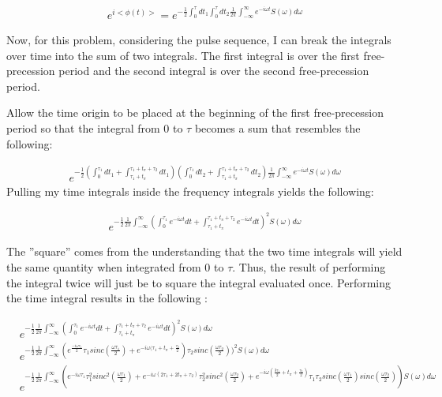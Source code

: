 \documentclass[12pt]{article}
\begin{document}
\begin{align}
e^{i<\phi(t)>} = e^{-\frac{1}{2}\int_0^\tau d t_1 \int_0^\tau d t_2 \frac{1}{2\pi}\int_{-\infty}^{\infty}e^{-i\omega t} S(\omega)d\omega} \nonumber
\end{align}

Now, for this problem, considering the pulse sequence, I can break the integrals over time into the sum of two integrals. The first integral is over the first free-precession period and the second integral is over the second free-precession period.

Allow the time origin to be placed at the beginning of the first free-precession period so that the integral from 0 to $\tau$ becomes a sum that resembles the following:

\begin{align}
e^{-\frac{1}{2}(\int_0^{\tau_1} d t_1 + \int_{\tau_1+t_\pi}^{\tau_1+t_\pi+\tau_2} d t_1) (\int_0^{\tau_1} d t_2 + \int_{\tau_1+t_\pi}^{\tau_1+t_\pi+\tau_2} d t_2) \frac{1}{2\pi}\int_{-\infty}^{\infty}e^{-i\omega t}S(\omega) d\omega}  \nonumber
\end{align}
Pulling my time integrals inside the frequency integrals yields the following:

\begin{align}
e^{-\frac{1}{2}\frac{1}{2\pi}\int_{-\infty}^{\infty}(\int_0^{\tau_1} e^{-i\omega t} dt + \int_{\tau_1+t_\pi}^{\tau_1+t_\pi+\tau_2} e^{-i\omega t} dt )^2 S(\omega) d\omega} \nonumber
\end{align}

The ''square'' comes from the understanding that the two time integrals will yield the same quantity when integrated from 0 to $\tau$. Thus, the result of performing the integral twice will just be to square the integral evaluated once. Performing the time integral results in the following :

\begin{align}
&e^{-\frac{1}{2}\frac{1}{2\pi}\int_{-\infty}^{\infty}(\int_0^{\tau_1} e^{-i\omega t} dt + \int_{\tau_1+t_\pi}^{\tau_1+t_\pi+\tau_2} e^{-i\omega t} dt )^2 S(\omega) d\omega} \nonumber \\
&e^{-\frac{1}{2}\frac{1}{2\pi}\int_{-\infty}^{\infty}(e^{\frac{-i\omega \tau_1}{2}} \tau_1 sinc(\frac{\omega \tau_1}{2}) + e^{-i \omega (\tau_1 +t_\pi + \frac{\tau_2}{2}}) \tau_2 sinc(\frac{\omega \tau_2}{2}))^2 S(\omega) d\omega} \nonumber \\
&e^{-\frac{1}{2}\frac{1}{2\pi}\int_{-\infty}^{\infty}(e^{-i\omega \tau_1} \tau_1^2 sinc^2(\frac{\omega \tau_1}{2}) + e^{-i \omega (2\tau_1 +2t_\pi + \tau_2)} \tau_2^2 sinc^2(\frac{\omega \tau_2}{2}) + e^{-i \omega (\frac{3\tau_1}{2}+t_\pi+\frac{\tau_2}{2})} \tau_1 \tau_2 sinc(\frac{\omega\tau_1}{2})sinc(\frac{\omega\tau_2}{2})) S(\omega) d\omega} \nonumber
\end{align}
\end{document}
